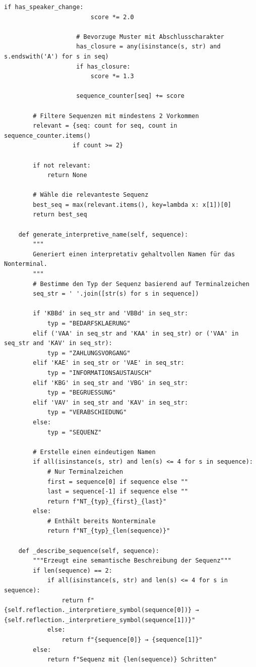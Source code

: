 \documentclass[
  12pt,
  a4paper,
  oneside,
  titlepage
]{article}
\begin{document}
\begin{lstlisting}[caption=Algorithmisch Rekursive Sequenzanalyse 3.0 - Hierarchische Grammatikinduktion]
                    if has_speaker_change:
                        score *= 2.0
                    
                    # Bevorzuge Muster mit Abschlusscharakter
                    has_closure = any(isinstance(s, str) and s.endswith('A') for s in seq)
                    if has_closure:
                        score *= 1.3
                    
                    sequence_counter[seq] += score
        
        # Filtere Sequenzen mit mindestens 2 Vorkommen
        relevant = {seq: count for seq, count in sequence_counter.items() 
                   if count >= 2}
        
        if not relevant:
            return None
        
        # Wähle die relevanteste Sequenz
        best_seq = max(relevant.items(), key=lambda x: x[1])[0]
        return best_seq
    
    def generate_interpretive_name(self, sequence):
        """
        Generiert einen interpretativ gehaltvollen Namen für das Nonterminal.
        """
        # Bestimme den Typ der Sequenz basierend auf Terminalzeichen
        seq_str = ' '.join([str(s) for s in sequence])
        
        if 'KBBd' in seq_str and 'VBBd' in seq_str:
            typ = "BEDARFSKLAERUNG"
        elif ('VAA' in seq_str and 'KAA' in seq_str) or ('VAA' in seq_str and 'KAV' in seq_str):
            typ = "ZAHLUNGSVORGANG"
        elif 'KAE' in seq_str or 'VAE' in seq_str:
            typ = "INFORMATIONSAUSTAUSCH"
        elif 'KBG' in seq_str and 'VBG' in seq_str:
            typ = "BEGRUESSUNG"
        elif 'VAV' in seq_str and 'KAV' in seq_str:
            typ = "VERABSCHIEDUNG"
        else:
            typ = "SEQUENZ"
        
        # Erstelle einen eindeutigen Namen
        if all(isinstance(s, str) and len(s) <= 4 for s in sequence):
            # Nur Terminalzeichen
            first = sequence[0] if sequence else ""
            last = sequence[-1] if sequence else ""
            return f"NT_{typ}_{first}_{last}"
        else:
            # Enthält bereits Nonterminale
            return f"NT_{typ}_{len(sequence)}"
    
    def _describe_sequence(self, sequence):
        """Erzeugt eine semantische Beschreibung der Sequenz"""
        if len(sequence) == 2:
            if all(isinstance(s, str) and len(s) <= 4 for s in sequence):
                return f"{self.reflection._interpretiere_symbol(sequence[0])} → {self.reflection._interpretiere_symbol(sequence[1])}"
            else:
                return f"{sequence[0]} → {sequence[1]}"
        else:
            return f"Sequenz mit {len(sequence)} Schritten"
    

\end{lstlisting}
\end{document}
